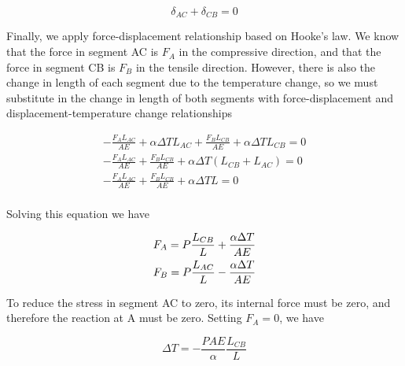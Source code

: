 \documentclass[
fontsize=10pt,
a4paper,
twosides=false,
open=any,
svgnames,
]{kaobook} %
\begin{document}
\begin{example}
  \[{\delta _{AC}} + {\delta _{CB}} = 0\]	

  Finally, we apply force-displacement relationship based on Hooke’s law. We know that the force in segment AC is $F_A$ in the compressive direction, and that the force in segment CB is $F_B$ in the tensile direction. However, there is also the change in length of each segment due to the temperature change, so we must substitute in the change in length of both segments with force-displacement and displacement-temperature change relationships
  
  \[\begin{gathered}
      - \frac{F_AL_{AC}}{AE} + \alpha \Delta T{L_{AC}} + \frac{F_BL_{CB}}{AE} + \alpha \Delta T{L_{CB}} = 0 \\ 
      - \frac{F_AL_{AC}}{AE} + \frac{F_BL_{CB}}{AE} + \alpha \Delta T(L_{CB} + L_{AC}) = 0 \\ 
      - \frac{F_AL_{AC}}{AE} + \frac{F_BL_{CB}}{AE} + \alpha \Delta TL = 0 \\ 
    \end{gathered} \]	
  
  Solving this equation we have
  
  \[\begin{gathered}
      {F_A} = P\frac{L_{CB}}{L} + \frac{\alpha \Delta T}{AE} \hfill \\
      {F_B} = P\frac{L_{AC}}{L} - \frac{\alpha \Delta T}{AE} \hfill \\ 
    \end{gathered} \]
  
  To reduce the stress in segment AC to zero, its internal force must be zero, and therefore the reaction at A must be zero. Setting $F_A = 0$, we have
  
  \[\Delta T =  - \frac{{PAE}}{\alpha }\frac{{{L_{CB}}}}{L}\]
  
\end{example}
\end{document}
